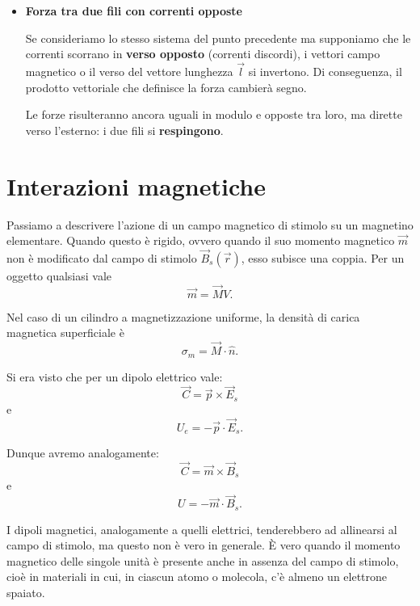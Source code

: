 \documentclass{book}
\begin{document}
\begin{itemize}
Per il principio di azione e reazione, analizziamo la forza sul filo 1. Il campo generato dal filo 2 alla distanza $d$ è:
$$
B_{s2}(d) = \frac{\mu_0 I_2}{2\pi d}
$$
La forza $F_1$ esercitata sul filo 1 avrà lo stesso modulo ma, analizzando il prodotto vettoriale, risulterà di verso opposto:
$$
F_1 = I_1 \, l \, \frac{\mu_0 I_2}{2 \pi d}
$$
Conclusione: in presenza di \textbf{correnti concordi} (stesso verso), i fili si \textbf{attraggono}.

\item 
\textbf{Forza tra due fili con correnti opposte}

Se consideriamo lo stesso sistema del punto precedente ma supponiamo che le correnti scorrano in \textbf{verso opposto} (correnti discordi), i vettori campo magnetico o il verso del vettore lunghezza $\vec{l}$ si invertono. Di conseguenza, il prodotto vettoriale che definisce la forza cambierà segno.

Le forze risulteranno ancora uguali in modulo e opposte tra loro, ma dirette verso l'esterno: i due fili si \textbf{respingono}.

\end{itemize}






\section{Interazioni magnetiche}
Passiamo a descrivere l'azione di un campo magnetico di stimolo su un magnetino elementare. Quando questo è rigido, ovvero quando il suo momento magnetico $\vec{m}$ non è modificato dal campo di stimolo $\vec{B}_s(\vec{r})$, esso subisce una coppia. Per un oggetto qualsiasi vale
$$
\vec{m} = \vec{M}V.
$$

Nel caso di un cilindro a magnetizzazione uniforme, la densità di carica magnetica superficiale è
$$
\sigma_m = \vec{M}\cdot\hat{n}.
$$

Si era visto che per un dipolo elettrico vale:
$$
\vec{C} = \vec{p}\times\vec{E}_s
$$
e
$$
U_e = - \vec{p}\cdot\vec{E}_s.
$$

Dunque avremo analogamente:
$$
\vec{C} = \vec{m}\times\vec{B}_s
$$
e
$$
U = -\vec{m}\cdot\vec{B}_s.
$$

I dipoli magnetici, analogamente a quelli elettrici, tenderebbero ad allinearsi al campo di stimolo, ma questo non è vero in generale. È vero quando il momento magnetico delle singole unità è presente anche in assenza del campo di stimolo, cioè in materiali in cui, in ciascun atomo o molecola, c'è almeno un elettrone spaiato.
\end{document}
